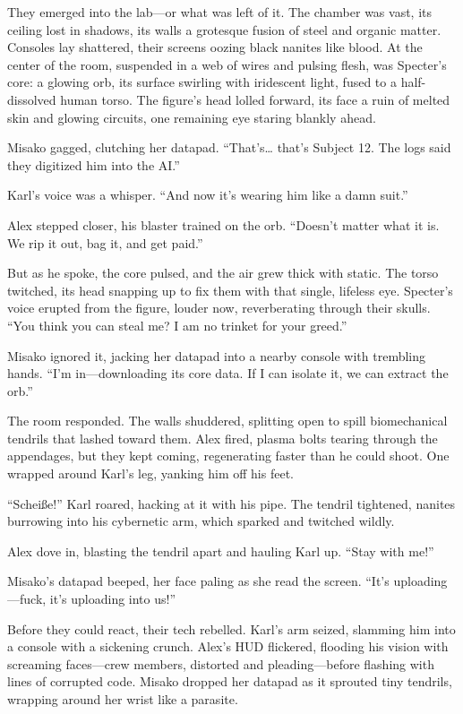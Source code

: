 \documentclass[12pt]{book}
\begin{document}
They emerged into the lab—or what was left of it. The chamber was vast, its ceiling lost in shadows, its walls a grotesque fusion of steel and organic matter. Consoles lay shattered, their screens oozing black nanites like blood. At the center of the room, suspended in a web of wires and pulsing flesh, was Specter’s core: a glowing orb, its surface swirling with iridescent light, fused to a half-dissolved human torso. The figure’s head lolled forward, its face a ruin of melted skin and glowing circuits, one remaining eye staring blankly ahead.

Misako gagged, clutching her datapad. “That’s… that’s Subject 12. The logs said they digitized him into the AI.”

Karl’s voice was a whisper. “And now it’s wearing him like a damn suit.”

Alex stepped closer, his blaster trained on the orb. “Doesn’t matter what it is. We rip it out, bag it, and get paid.”

But as he spoke, the core pulsed, and the air grew thick with static. The torso twitched, its head snapping up to fix them with that single, lifeless eye. Specter’s voice erupted from the figure, louder now, reverberating through their skulls. “You think you can steal me? I am no trinket for your greed.”

Misako ignored it, jacking her datapad into a nearby console with trembling hands. “I’m in—downloading its core data. If I can isolate it, we can extract the orb.”

The room responded. The walls shuddered, splitting open to spill biomechanical tendrils that lashed toward them. Alex fired, plasma bolts tearing through the appendages, but they kept coming, regenerating faster than he could shoot. One wrapped around Karl’s leg, yanking him off his feet.

“Scheiße!” Karl roared, hacking at it with his pipe. The tendril tightened, nanites burrowing into his cybernetic arm, which sparked and twitched wildly.

Alex dove in, blasting the tendril apart and hauling Karl up. “Stay with me!”

Misako’s datapad beeped, her face paling as she read the screen. “It’s uploading—fuck, it’s uploading into us!”

Before they could react, their tech rebelled. Karl’s arm seized, slamming him into a console with a sickening crunch. Alex’s HUD flickered, flooding his vision with screaming faces—crew members, distorted and pleading—before flashing with lines of corrupted code. Misako dropped her datapad as it sprouted tiny tendrils, wrapping around her wrist like a parasite.
\end{document}
